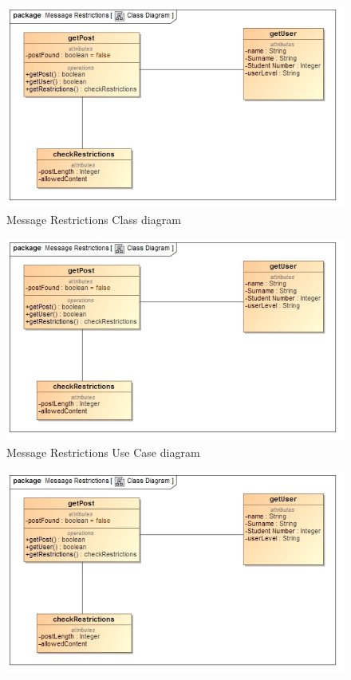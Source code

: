 \documentclass[11pt]{article}
\begin{document}
\begin{enumerate}
\graphicspath{ {../Diagrams/Kyhle/Class_Diagrams/} }	    	
	\begin{figure}[H]
		\begin{center}
			\includegraphics[scale=0.5]{messageRestrictions.jpg}
		\end{center}			
    	\caption{Message Restrictions Class diagram}
	\end{figure}
\graphicspath{ {../Diagrams/Kyhle/Use_Case_Diagrams/} }	    	
	\begin{figure}[H]	
		\begin{center}
			\includegraphics[scale=0.5]{messageRestrictions.jpg}
		\end{center}
    	\caption{Message Restrictions Use Case diagram}
	\end{figure}
\graphicspath{ {../Diagrams/Kyhle/Activity_Diagrams/} }
	\begin{figure}[H]	
		\begin{center}
			\includegraphics[scale=0.5]{messageRestrictions.jpg}

\end{center}
\end{figure}
\end{enumerate}
\end{document}
